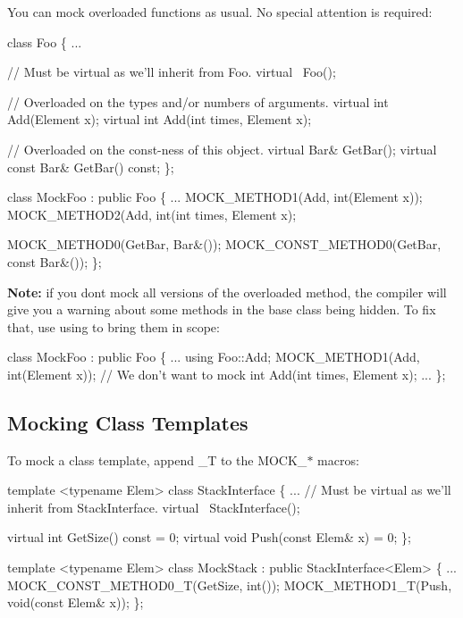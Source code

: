 You can mock overloaded functions as usual. No special attention is required\+:


\begin{DoxyCode}
class Foo \{
  ...

  // Must be virtual as we'll inherit from Foo.
  virtual ~Foo();

  // Overloaded on the types and/or numbers of arguments.
  virtual int Add(Element x);
  virtual int Add(int times, Element x);

  // Overloaded on the const-ness of this object.
  virtual Bar& GetBar();
  virtual const Bar& GetBar() const;
\};

class MockFoo : public Foo \{
  ...
  MOCK\_METHOD1(Add, int(Element x));
  MOCK\_METHOD2(Add, int(int times, Element x);

  MOCK\_METHOD0(GetBar, Bar&());
  MOCK\_CONST\_METHOD0(GetBar, const Bar&());
\};
\end{DoxyCode}


{\bfseries Note\+:} if you don\textquotesingle{}t mock all versions of the overloaded method, the compiler will give you a warning about some methods in the base class being hidden. To fix that, use {\ttfamily using} to bring them in scope\+:


\begin{DoxyCode}
class MockFoo : public Foo \{
  ...
  using Foo::Add;
  MOCK\_METHOD1(Add, int(Element x));
  // We don't want to mock int Add(int times, Element x);
  ...
\};
\end{DoxyCode}


\subsection*{Mocking Class Templates}

To mock a class template, append {\ttfamily \+\_\+T} to the {\ttfamily M\+O\+C\+K\+\_\+$\ast$} macros\+:


\begin{DoxyCode}
template <typename Elem>
class StackInterface \{
  ...
  // Must be virtual as we'll inherit from StackInterface.
  virtual ~StackInterface();

  virtual int GetSize() const = 0;
  virtual void Push(const Elem& x) = 0;
\};

template <typename Elem>
class MockStack : public StackInterface<Elem> \{
  ...
  MOCK\_CONST\_METHOD0\_T(GetSize, int());
  MOCK\_METHOD1\_T(Push, void(const Elem& x));
\};
\end{DoxyCode}


